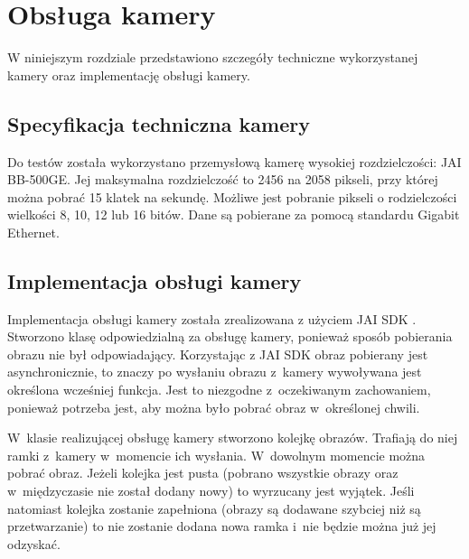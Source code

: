 \chapter{Obsługa kamery}
\label{cha:obslugakamery}

W niniejszym rozdziale przedstawiono szczegóły techniczne wykorzystanej kamery oraz implementację obsługi kamery.

\section{Specyfikacja techniczna kamery}
\label{sec:specyfikacjaKamery}

Do testów została wykorzystano przemysłową kamerę wysokiej rozdzielczości: JAI BB-500GE. Jej maksymalna rozdzielczość to 2456 na 2058 pikseli, przy której można pobrać 15 klatek na sekundę. Możliwe jest pobranie pikseli o rodzielczości wielkości 8, 10, 12 lub 16 bitów. Dane są pobierane za pomocą standardu Gigabit Ethernet. 

\section{Implementacja obsługi kamery}
\label{sec:implementacjaKamery}

Implementacja obsługi kamery została zrealizowana z użyciem JAI SDK \cite{JAISDK}. Stworzono klasę odpowiedzialną za obsługę kamery, ponieważ sposób pobierania obrazu nie był odpowiadający. Korzystając z JAI SDK obraz pobierany jest asynchronicznie, to znaczy po wysłaniu obrazu z~kamery wywoływana jest określona wcześniej funkcja. Jest to niezgodne z~oczekiwanym zachowaniem, ponieważ potrzeba jest, aby można było pobrać obraz w~określonej chwili.

W~klasie realizującej obsługę kamery stworzono kolejkę obrazów. Trafiają do niej ramki z~kamery w~momencie ich wysłania. W~dowolnym momencie można pobrać obraz. Jeżeli kolejka jest pusta (pobrano wszystkie obrazy oraz w~międzyczasie nie został dodany nowy) to wyrzucany jest wyjątek. Jeśli natomiast kolejka zostanie zapełniona (obrazy są dodawane szybciej niż są przetwarzanie) to nie zostanie dodana nowa ramka i~nie będzie można już jej odzyskać.
